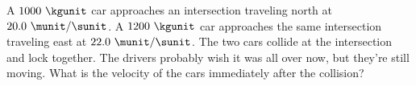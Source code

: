 A $1000\ \kgunit$ car approaches an intersection traveling north at
$20.0\ \munit/\sunit$. A $1200\ \kgunit$ car approaches the same
intersection traveling east at $22.0\ \munit/\sunit$. The two cars
collide at the intersection and lock together. The drivers probably
wish it was all over now, but they're still moving. What is the
velocity of the cars immediately after the collision?
